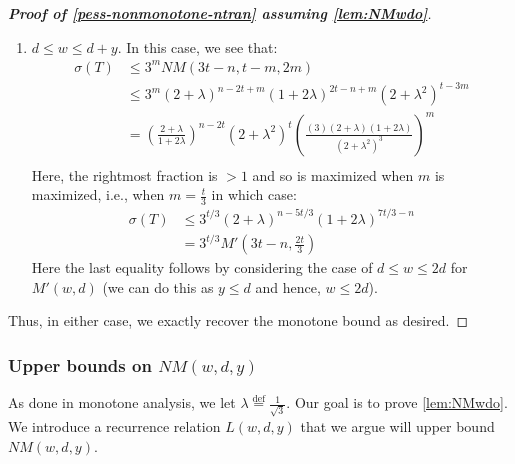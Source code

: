 \documentclass[10pt,a4paper]{article}
\newcommand{\eqdef}{\stackrel{\textrm{def}}{=}}
\newcommand{\total}{\sigma}
\newcommand{\openinteger}{y}
\begin{document}
\begin{proof}[\textbf{Proof of \cref{pess-nonmonotone-ntran} assuming \cref{lem:NMwdo}}]
\begin{enumerate}[label=\textbf{Case \arabic*:}, itemindent=*, leftmargin=0em]
\item $d\le w\le d + \openinteger$.
In this case, we see that:
\begin{align*}
\total(T)
& \le 3^m NM\left(3t-n, t - m, 2m\right)\\
& \le 3^m (2+\lambda)^{n-2t+m}(1+2\lambda)^{2t-n+m}(2+\lambda^2)^{t-3m}\\
& = \left(\frac{2+\lambda}{1+2\lambda}\right)^{n-2t}(2+\lambda^2)^t\left(\frac{(3)(2+\lambda)(1+2\lambda)}{(2+\lambda^2)^3}\right)^m\\
\end{align*}
Here, the rightmost fraction is $> 1$ and so is maximized when $m$ is maximized, i.e., when $m = \frac{t}{3}$ in which case:
\begin{align*}
\total(T)
& \le 3^{t/3} (2+\lambda)^{n - 5t/3} (1+2\lambda)^{7t/3 - n}\\
& = 3^{t/3} M'\left(3t-n, \frac{2t}{3}\right)
\end{align*}
Here the last equality follows by considering the case of $d\le w\le 2d$ for $M'(w, d)$ (we can do this as $\openinteger \le d$ and hence, $w\le 2d$).
\end{enumerate}

Thus, in either case, we exactly recover the monotone bound as desired.
\end{proof}








\subsubsection{Upper bounds on $NM(w, d, \openinteger)$}

As done in monotone analysis, we let $\lambda \eqdef \frac{1}{\sqrt{3}}$. 
Our goal is to prove \cref{lem:NMwdo}.
We introduce a recurrence relation $L(w, d, \openinteger)$ that we argue will upper bound $NM(w, d, \openinteger)$.
\end{document}
